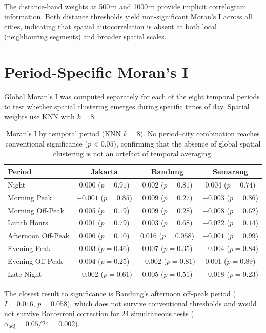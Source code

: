 \documentclass[preprint,12pt]{elsarticle}
\begin{document}
The distance-band weights at 500\,m and 1000\,m provide implicit correlogram information. Both distance thresholds yield non-significant Moran's I across all cities, indicating that spatial autocorrelation is absent at both local (neighbouring segments) and broader spatial scales.

\section{Period-Specific Moran's I}
\label{sec:s2}

Global Moran's I was computed separately for each of the eight temporal periods to test whether spatial clustering emerges during specific times of day. Spatial weights use KNN with $k{=}8$.

\begin{table}[!htbp]
\centering
\caption{Moran's I by temporal period (KNN $k{=}8$). No period--city combination reaches conventional significance ($p < 0.05$), confirming that the absence of global spatial clustering is not an artefact of temporal averaging.}
\label{tab:s2}
\begin{tabular}{lccc}
\toprule
Period & Jakarta & Bandung & Semarang \\
\midrule
Night             & 0.000 ($p{=}0.91$)    & 0.002 ($p{=}0.81$)    & 0.004 ($p{=}0.74$)    \\
Morning Peak      & $-0.001$ ($p{=}0.85$) & 0.009 ($p{=}0.27$)    & $-0.003$ ($p{=}0.86$) \\
Morning Off-Peak  & 0.005 ($p{=}0.19$)    & 0.009 ($p{=}0.28$)    & $-0.008$ ($p{=}0.62$) \\
Lunch Hours       & 0.001 ($p{=}0.79$)    & 0.003 ($p{=}0.68$)    & $-0.022$ ($p{=}0.14$) \\
Afternoon Off-Peak& 0.006 ($p{=}0.10$)    & 0.016 ($p{=}0.058$)   & $-0.001$ ($p{=}0.99$) \\
Evening Peak      & 0.003 ($p{=}0.46$)    & 0.007 ($p{=}0.35$)    & $-0.004$ ($p{=}0.84$) \\
Evening Off-Peak  & 0.004 ($p{=}0.25$)    & $-0.002$ ($p{=}0.81$) & 0.001 ($p{=}0.89$)    \\
Late Night        & $-0.002$ ($p{=}0.61$) & 0.005 ($p{=}0.51$)    & $-0.018$ ($p{=}0.23$) \\
\bottomrule
\end{tabular}
\end{table}

The closest result to significance is Bandung's afternoon off-peak period ($I{=}0.016$, $p{=}0.058$), which does not survive conventional thresholds and would not survive Bonferroni correction for 24 simultaneous tests ($\alpha_{\text{adj}} = 0.05/24 = 0.002$).
\end{document}
